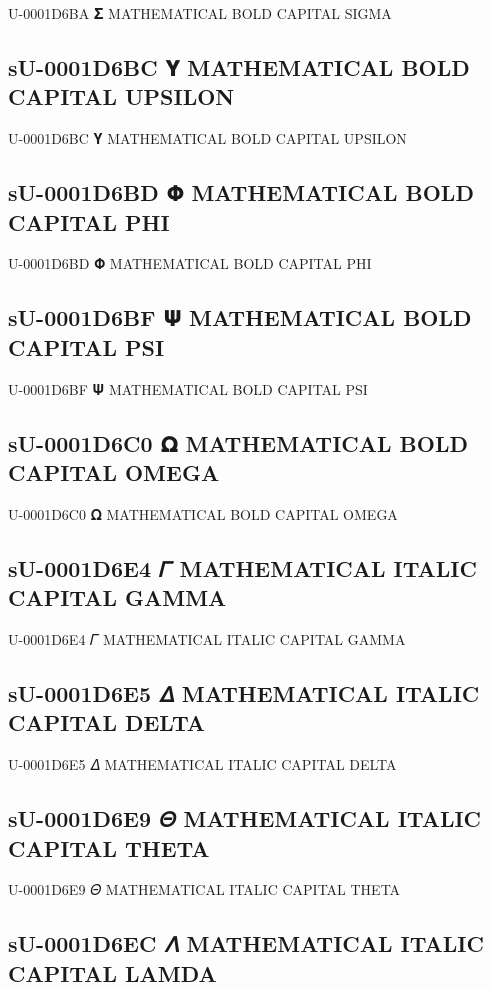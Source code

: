 U-0001D6BA 𝚺 MATHEMATICAL BOLD CAPITAL SIGMA

\subsection{sU-0001D6BC 𝚼 MATHEMATICAL BOLD CAPITAL UPSILON}

U-0001D6BC 𝚼 MATHEMATICAL BOLD CAPITAL UPSILON

\subsection{sU-0001D6BD 𝚽 MATHEMATICAL BOLD CAPITAL PHI}

U-0001D6BD 𝚽 MATHEMATICAL BOLD CAPITAL PHI

\subsection{sU-0001D6BF 𝚿 MATHEMATICAL BOLD CAPITAL PSI}

U-0001D6BF 𝚿 MATHEMATICAL BOLD CAPITAL PSI

\subsection{sU-0001D6C0 𝛀 MATHEMATICAL BOLD CAPITAL OMEGA}

U-0001D6C0 𝛀 MATHEMATICAL BOLD CAPITAL OMEGA

\subsection{sU-0001D6E4 𝛤 MATHEMATICAL ITALIC CAPITAL GAMMA}

U-0001D6E4 𝛤 MATHEMATICAL ITALIC CAPITAL GAMMA

\subsection{sU-0001D6E5 𝛥 MATHEMATICAL ITALIC CAPITAL DELTA}

U-0001D6E5 𝛥 MATHEMATICAL ITALIC CAPITAL DELTA

\subsection{sU-0001D6E9 𝛩 MATHEMATICAL ITALIC CAPITAL THETA}

U-0001D6E9 𝛩 MATHEMATICAL ITALIC CAPITAL THETA

\subsection{sU-0001D6EC 𝛬 MATHEMATICAL ITALIC CAPITAL LAMDA}

